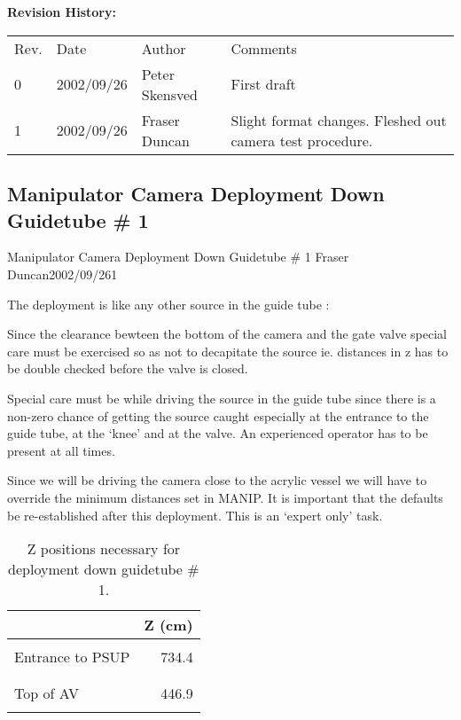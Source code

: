 {\small
~\\
~\\
\noindent
{\bf Revision History:}\\
\begin{tabular}{llll}
Rev. & Date & Author & Comments\\
0           & 
2002/09/26  & 
Peter Skensved &
\parbox[t]{3.0in}{
  First draft
}\\

1             & 
2002/09/26    & 
Fraser Duncan &
\parbox[t]{3.0in}{
  Slight format changes.  Fleshed out camera test procedure.
}
\end{tabular}
}




\clearpage

\subsection{Manipulator Camera Deployment Down Guidetube \# 1}
             {Manipulator Camera Deployment Down Guidetube \# 1}
             {Fraser Duncan}{2002/09/26}{1}


\noindent
  The deployment is like any other source in the guide tube :

Since the clearance bewteen the bottom of the camera and the gate valve
special care must be exercised so as not to decapitate the source ie.
distances in z has to be double checked before the valve is closed.

Special care must be while driving the source in the guide tube since there
is a non-zero chance of getting the source caught especially at the entrance
to the guide tube, at the `knee' and at the valve. An experienced operator
has to be present at all times.


Since we will be driving the camera close to the acrylic vessel we will have to
override the minimum distances set in MANIP. It is important that the 
defaults be re-established after this deployment. This is an `expert only' 
task.


\begin{table}
\begin{center}
\begin{tabular}{|l|r|}
\hline
                  &   Z (cm) \\
\hline
  & \\
Entrance to PSUP  &  734.4  \\
  & \\
\hline
  & \\
Top of AV         &  446.9  \\
  & \\
\hline
\end{tabular}
\caption[Camera deployment down GT1]
  {Z positions necessary for deployment down guidetube \# 1.
  }
\end{center}
\end{table}

